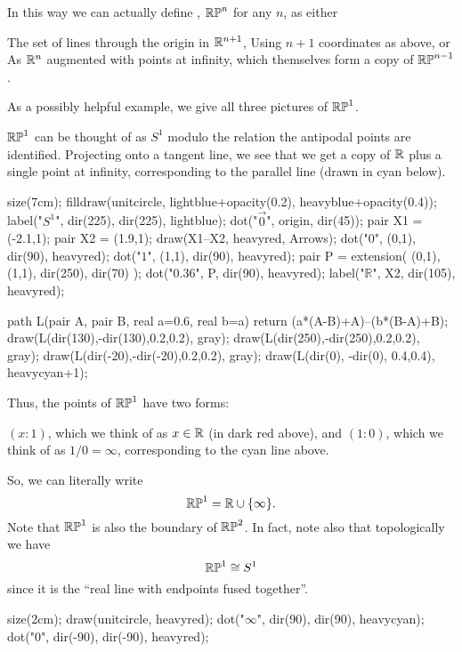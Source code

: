 In this way we can actually define ,
$\mathbb{RP}^n$ for any $n$, as either
\begin{enumerate}[(i)]
	\ii The set of lines through the origin in $\mathbb R^{n+1}$,
	\ii Using $n+1$ coordinates as above, or
	\ii As $\mathbb R^n$ augmented with points at infinity,
	which themselves form a copy of $\mathbb{RP}^{n-1}$.
\end{enumerate}

As a possibly helpful example, we give all three pictures of $\mathbb{RP}^1$.
\begin{example}
	$\mathbb{RP}^1$ can be thought of as $S^1$ modulo the relation
	the antipodal points are identified.
	Projecting onto a tangent line, we see that we get
	a copy of $\mathbb R$ plus a single point at infinity, corresponding
	to the parallel line (drawn in cyan below).
	\begin{center}
		\begin{asy}
			size(7cm);
			filldraw(unitcircle, lightblue+opacity(0.2), heavyblue+opacity(0.4));
			label("$S^1$", dir(225), dir(225), lightblue);
			dot("$\vec 0$", origin, dir(45));
			pair X1 = (-2.1,1);
			pair X2 = (1.9,1);
			draw(X1--X2, heavyred, Arrows);
			dot("$0$", (0,1), dir(90), heavyred);
			dot("$1$", (1,1), dir(90), heavyred);
			pair P = extension( (0,1), (1,1), dir(250), dir(70) );
			dot("$0.36$", P, dir(90), heavyred);
			label("$\mathbb R$", X2, dir(105), heavyred);

			path L(pair A, pair B, real a=0.6, real b=a)
				{ return (a*(A-B)+A)--(b*(B-A)+B); }
			draw(L(dir(130),-dir(130),0.2,0.2), gray);
			draw(L(dir(250),-dir(250),0.2,0.2), gray);
			draw(L(dir(-20),-dir(-20),0.2,0.2), gray);
			draw(L(dir(0), -dir(0), 0.4,0.4), heavycyan+1);
		\end{asy}
	\end{center}

	Thus, the points of $\mathbb{RP}^1$ have two forms:
	\begin{itemize}
		\ii $(x:1)$, which we think of as $x \in \mathbb R$ (in dark red above), and
		\ii $(1:0)$, which we think of as $1/0 = \infty$,
		corresponding to the cyan line above.
	\end{itemize}
	So, we can literally write
	\[ \mathbb{RP}^1 = \mathbb R \cup \{\infty\}. \]
	Note that $\mathbb{RP}^1$ is also the boundary of $\mathbb{RP}^2$.
	In fact, note also that topologically we have
	\[ \mathbb{RP}^1 \cong S^1 \]
	since it is the ``real line with endpoints fused together''.
	\begin{center}
		\begin{asy}
			size(2cm);
			draw(unitcircle, heavyred);
			dot("$\infty$", dir(90), dir(90), heavycyan);
			dot("$0$", dir(-90), dir(-90), heavyred);
		\end{asy}
	\end{center}
\end{example}

